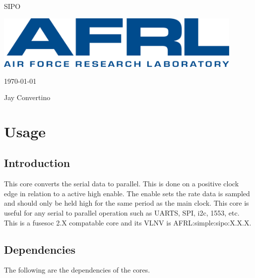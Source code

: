 \begin{titlepage}
  \begin{center}

  {\Huge SIPO}

  \vspace{25mm}

  \includegraphics[width=0.90\textwidth,height=\textheight,keepaspectratio]{img/AFRL.png}

  \vspace{25mm}

  \today

  \vspace{15mm}

  {\Large Jay Convertino}

  \end{center}
\end{titlepage}

\tableofcontents

\newpage

\section{Usage}

\subsection{Introduction}

\par
This core converts the serial data to parallel. This is done on a positive clock edge in relation to a active high enable.
The enable sets the rate data is sampled and should only be held high for the same period as the main clock. This core is useful for
any serial to parallel operation such as UARTS, SPI, i2c, 1553, etc. This is a fusesoc 2.X compatable core and its VLNV is
AFRL:simple:sipo:X.X.X.

\subsection{Dependencies}

\par
The following are the dependencies of the cores.

